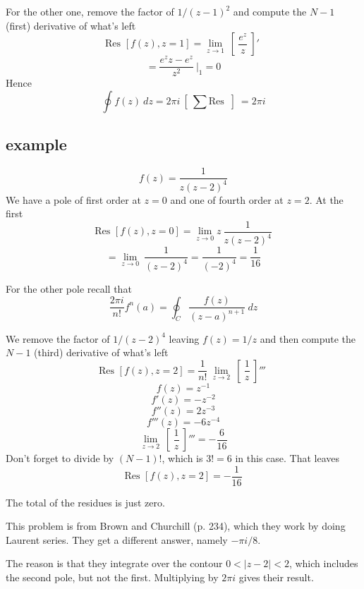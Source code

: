 \documentclass[11pt, oneside]{article}
\begin{document}
For the other one, remove the factor of $1/(z-1)^2$ and compute the $N-1$ (first) derivative of what's left
\[ \text{Res } [f(z),z=1] = \lim_{z \rightarrow 1} \ [ \ \frac{e^z}{z} \ ]' \ \]
\[ = \frac{e^z z - e^z}{z^2} \ \bigg |_1 =  0 \]
Hence
\[ \oint f(z) \ dz = 2 \pi i \ [ \ \sum  \text{Res } \ ] \ = 2 \pi i \]

\subsection*{example}
\[ f(z) = \frac{1}{z(z-2)^4} \]
We have a pole of first order at $z=0$ and one of fourth order at $z=2$.  At the first
\[ \text{Res } [f(z),z=0] = \lim_{z \rightarrow 0}  z \ \frac{1}{z(z-2)^4} \]
\[ =  \lim_{z \rightarrow 0} \ \frac{1}{(z-2)^4}  = \frac{1}{(-2)^4} =  \frac{1}{16} \]

For the other pole recall that
\[ \frac{2 \pi i}{n!} f^n(a) = \oint_C \frac{f(z)}{(z-a)^{n+1}} \ dz \]

We remove the factor of $1/(z-2)^4$ leaving $f(z) = 1/z$ and then compute the $N-1$ (third) derivative of what's left
\[ \text{Res } [f(z),z=2] = \frac{1}{n!} \ \lim_{z \rightarrow 2} \ [ \ \frac{1}{z} \ ]''' \ \]
\[ f(z) = z^{-1} \]
\[ f'(z) = - z^{-2} \]
\[ f''(z) = 2 z^{-3} \]
\[ f'''(z) = -6 z^{-4} \]
\[  \lim_{z \rightarrow 2} \ [ \ \frac{1}{z} \ ]''' = - \frac{6}{16} \]
Don't forget to divide by $(N-1)!$, which is $3! = 6$ in this case.  That leaves
\[ \text{Res } [f(z),z=2] = - \frac{1}{16} \]

The total of the residues is just zero.  

This problem is from Brown and Churchill (p. 234), which they work by doing Laurent series.  They get a different answer, namely $-\pi i/8$.  

The reason is that they integrate over the contour $0 < | z - 2 | < 2$, which includes the second pole, but not the first.  Multiplying by $2 \pi i$ gives their result.
\end{document}
